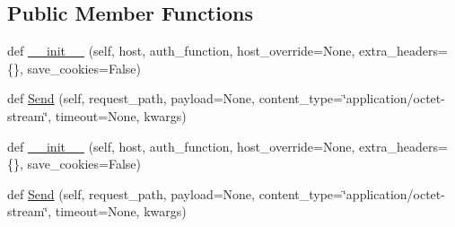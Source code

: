 \subsection*{Public Member Functions}
\begin{DoxyCompactItemize}
\item 
def \hyperlink{classupload_1_1AbstractRpcServer_a3f6bc1bd16b52bd5a5c33a1fedeef2d0}{\+\_\+\+\_\+init\+\_\+\+\_\+} (self, host, auth\+\_\+function, host\+\_\+override=None, extra\+\_\+headers=\{\}, save\+\_\+cookies=False)
\item 
def \hyperlink{classupload_1_1AbstractRpcServer_ac1b913f8bd00da4741c47ab49ea94cb5}{Send} (self, request\+\_\+path, payload=None, content\+\_\+type=\char`\"{}application/octet-\/stream\char`\"{}, timeout=None, kwargs)
\item 
def \hyperlink{classupload_1_1AbstractRpcServer_a3f6bc1bd16b52bd5a5c33a1fedeef2d0}{\+\_\+\+\_\+init\+\_\+\+\_\+} (self, host, auth\+\_\+function, host\+\_\+override=None, extra\+\_\+headers=\{\}, save\+\_\+cookies=False)
\item 
def \hyperlink{classupload_1_1AbstractRpcServer_ac1b913f8bd00da4741c47ab49ea94cb5}{Send} (self, request\+\_\+path, payload=None, content\+\_\+type=\char`\"{}application/octet-\/stream\char`\"{}, timeout=None, kwargs)
\end{DoxyCompactItemize}
